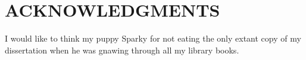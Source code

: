 
\chapter*{ACKNOWLEDGMENTS}

I would like to think my puppy Sparky for not eating the only extant copy of
my dissertation when he was gnawing through all my library books.

